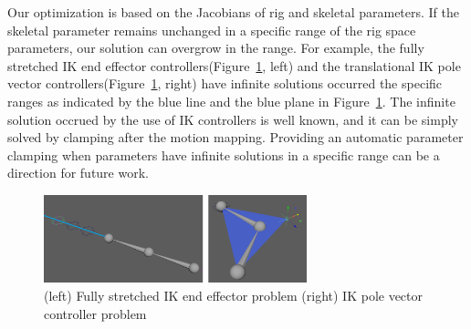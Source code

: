 Our optimization is based on the Jacobians of rig and skeletal parameters.
If the skeletal parameter remains unchanged in a specific range of the rig space parameters, our solution can overgrow in the range.
For example, the fully stretched IK end effector controllers(Figure~\ref{fig:limit}, left) and the translational IK pole vector controllers(Figure~\ref{fig:limit}, right) have infinite solutions occurred the specific ranges as indicated by the blue line and the blue plane in Figure~\ref{fig:limit}.
The infinite solution occrued by the use of IK controllers is well known, and it can be simply solved by clamping\cite{buss2004introduction} after the motion mapping. Providing an automatic parameter clamping when parameters have infinite solutions in a specific range can be a direction for future work.

\begin{figure}[!ht]
\centering
\includegraphics[width=3.0in]{images/ikProblem}
\caption{(left) Fully stretched IK end effector problem (right) IK pole vector controller problem}
\label{fig:limit}
\end{figure}
